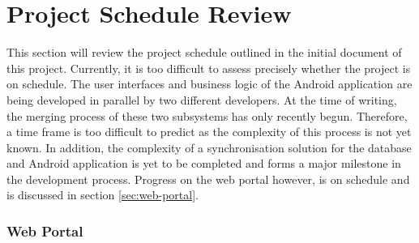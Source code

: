 \documentclass[11pt,a4paper]{article}
\begin{document}
\section{Project Schedule Review}

This section will review the project schedule outlined in the initial document of this project. Currently, it is too difficult to assess precisely whether the project is on schedule. The user interfaces and business logic of the Android application are being developed in parallel by two different developers. At the time of writing, the merging process of these two subsystems has only recently begun. Therefore, a time frame is too difficult to predict as the complexity of this process is not yet known. In addition, the complexity of a synchronisation solution for the database and Android application is yet to be completed and forms a major milestone in the development process. Progress on the web portal however, is on schedule and is discussed in section \ref{sec:web-portal}.


\subsubsection{Web Portal}
\end{document}
